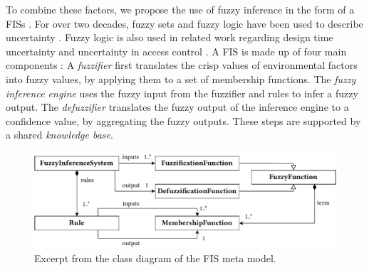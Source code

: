 To combine these factors, we propose the use of fuzzy inference in the form of a \acp{FIS} \cite{klir_fuzzy_1995}.
For over two decades, fuzzy sets and fuzzy logic have been used to describe uncertainty \cite{klir_fuzzy_1995}. 
Fuzzy logic is also used in related work regarding design time uncertainty and uncertainty in access control \cite{cheng_fuzzy_2007,esfahani_guidearch_2013,hosmer_using_1992,troya_uncertainty_2021}.
A \ac{FIS} is made up of four main components \cite{klir_fuzzy_1995}:
A \emph{fuzzifier} first translates the crisp values of environmental factors into fuzzy values, by applying them to a set of membership functions. 
The \emph{fuzzy inference engine} uses the fuzzy input from the fuzzifier and rules to infer a fuzzy output. 
The \emph{defuzzifier} translates the fuzzy output of the inference engine to a confidence value, by aggregating the fuzzy outputs.
These steps are supported by a shared \emph{knowledge base}.

\begin{figure}
    \centering
    \includegraphics[width=\linewidth]{figures/chapter7/fis-metamodel.pdf}
    \caption{Excerpt from the class diagram of the \acf*{FIS} meta model.}
    \label{fig:confidentialityanalysis:fismetamodel}
\end{figure}

